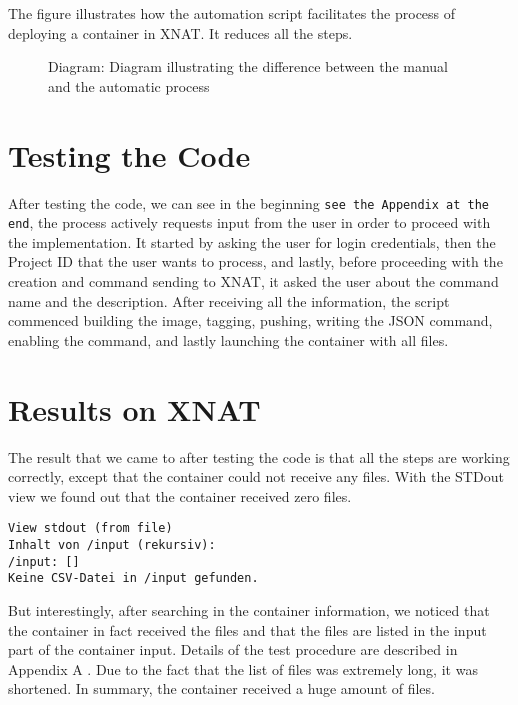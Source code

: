 The figure illustrates how the automation script facilitates the process of deploying a container in XNAT. It reduces all the steps.

\begin{figure}[ht]
    \centering
    \def\svgwidth{0.9\linewidth}
    
    \caption{Diagram: Diagram illustrating the difference between the manual and the automatic process}
    \label{fig:enter-label}
\end{figure}

\begin{comment}
    https://wiki.xnat.org/documentation/strategies-for-xnat-image-data-storage
\end{comment}


\section{Testing the Code}
After testing the code, we can see in the beginning \texttt{see the Appendix at the end}, the process actively requests input from the user in order to proceed with the implementation. It started by asking the user for login credentials, then the Project ID that the user wants to process, and lastly, before proceeding with the creation and command sending to XNAT, it asked the user about the command name and the description.
After receiving all the information, the script commenced building the image, tagging, pushing, writing the JSON command, enabling the command, and lastly launching the container with all files.

\section{Results on XNAT}
The result that we came to after testing the code is that all the steps are working correctly, except that the container could not receive any files. With the \ac{STDout} view we found out that the container received zero files. 
 
\begin{lstlisting}[numbers=none]
View stdout (from file)
Inhalt von /input (rekursiv):
/input: []
Keine CSV-Datei in /input gefunden.
\end{lstlisting}


But interestingly, after searching in the container information, we noticed that the container in fact received the files and that the files are listed in the input part of the container input. 
Details of the test procedure are described in Appendix A \cite{bousfiha2025appendix}. Due to the fact that the list of files was extremely long, it was shortened. In summary, the container received a huge amount of files.


